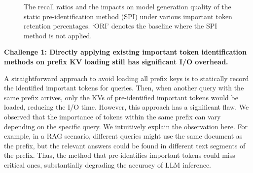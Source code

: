 \label{motiv}

\begin{figure}
	\centering
	\hspace{0.06in}
	\vspace{-0.2in}
	\caption{The recall ratios and the impacts on model generation quality of the static pre-identification method (SPI) under various important token retention percentages. `ORI' denotes the baseline where the SPI method is not applied.}
	\label{fig:static_methods}
	\vspace{-0.2in}
\end{figure}


\noindent \textbf{Challenge 1: Directly applying existing important token identification methods on prefix KV loading still has significant I/O overhead.}

A straightforward approach to avoid loading all prefix keys is to statically record the identified important tokens for queries. Then, when another query with the same prefix arrives, only the KVs of pre-identified important tokens would be loaded, reducing the I/O time.
However, this approach has a significant flaw. We observed that the importance
of tokens within the same prefix can vary depending on the specific query. We
intuitively explain the observation here. For example, in a RAG scenario,
different queries might use the same document as the prefix, but the relevant
answers could be found in different text segments of the prefix. 
Thus, the method that pre-identifies important tokens could miss critical ones, substantially degrading the accuracy of LLM inference.

